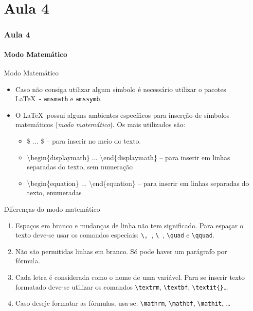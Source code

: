 
\part{Aula 4}
\section{Aula 4}

\subsection{Modo Matemático}

\begin{frame}[fragile]{Modo Matemático}
    \begin{itemize}
    \item Caso não consiga utilizar algum simbolo é necessário utilizar o pacotes \LaTeX\ - \verb|amsmath| e \verb|amssymb|.
    \item O \LaTeX\ possui alguns ambientes específicos para inserção de símbolos matemáticos (\textit{modo matemático}). Os mais utilizados são:
        \begin{itemize}
        \item \alert{\$} ... \alert{\$} -- para inserir no meio do texto.
        \item \alert{\textbackslash begin\{displaymath\} ... \textbackslash end\{displaymath\}} -- para inserir em linhas separadas do texto, sem numeração
        \item \alert{\textbackslash begin\{equation\} ... \textbackslash end\{equation\}} -- para inserir em linhas separadas do texto, enumeradas
        \end{itemize}
    \end{itemize}
\end{frame}

\begin{frame}[fragile]{Diferenças do modo matemático}
    \begin{enumerate}
    \item Espaços em branco e mudanças de linha não tem significado. Para espaçar o texto deve-se usar os comandos especiais: \verb|\, |, \verb*|\ |, \verb|\quad| e \verb|\qquad|.
    \item Não são permitidas linhas em branco. Só pode haver um parágrafo por fórmula.
    \item Cada letra é considerada como o nome de uma variável. Para se inserir texto formatado deve-se utilizar os comandos \verb|\textrm|, \verb|\textbf|, \verb|\textit{}|\dots
    \item Caso deseje formatar as fórmulas, usa-se: \verb|\mathrm|, \verb|\mathbf|, \verb|\mathit|, \dots
    \end{enumerate}
\end{frame}

